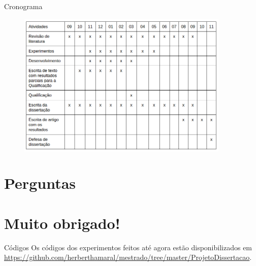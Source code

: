\documentclass{beamer}
\begin{document}
  \begin{frame}{Cronograma}
      \begin{figure}
          \centering
          \includegraphics[width=0.9\textwidth]{cronograma.png}
      \end{figure}
  \end{frame}

  \section{Perguntas}
  \section{Muito obrigado!}
  \begin{frame}{Códigos}
      Os códigos dos experimentos feitos até agora estão disponibilizados em \url{https://github.com/herberthamaral/mestrado/tree/master/ProjetoDissertacao}.
  \end{frame}



  \begin{frame}
      
      
  \end{frame}
\end{document}

